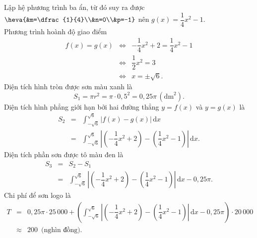 \begin{bt}
{		Lập hệ phương trình ba ẩn, từ đó  suy ra được $\heva{&m=\dfrac{1}{4}\\&n=0\\&p=-1}$ nên $g(x)=\dfrac{1}{4}x^2-1$.\\
		Phương trình  hoành độ giao điểm
		 \allowdisplaybreaks
		\begin{eqnarray*}
			 f(x)=g(x)&\Leftrightarrow&-\dfrac{1}{4}x^2+2=\dfrac{1}{4}x^2-1\\
			 &\Leftrightarrow&\dfrac{1}{2}x^2=3\\
			&\Leftrightarrow&x=\pm \sqrt  6.
		\end{eqnarray*}
		 Diện tích hình tròn được sơn màu xanh là \[S_1=\pi r^2=\pi\cdot 0{,}5^2=0{,}25 \pi\,(\text{dm}^2).\]
		Diện tích hình phẳng giới hạn bởi hai  đường thẳng $y=f(x)$ và $y=g(x)$ là
		\allowdisplaybreaks 
		\begin{eqnarray*}
			 S_2&=&\displaystyle\int_{-\sqrt 6}^{\sqrt 6}|f(x)-g(x)|\mathrm{\,d}x\\
			&=&\displaystyle\int_{-\sqrt  6}^{\sqrt 6}\left|\left(-\dfrac{1}{4}x^2+2\right)-\left(\dfrac{1}{4}x^2-1\right)\right|\mathrm{\,d}x.
		\end{eqnarray*}
		Diện tích phần  sơn được tô màu đen là
		 \allowdisplaybreaks
		\begin{eqnarray*}
			S_3&=&S_2-S_1\\ 
			&=&\displaystyle\int_{-\sqrt 6}^{\sqrt 6}\left|\left(-\dfrac{1}{4}x^2+2\right)-\left(\dfrac{1}{4}x^2-1\right)\right|  \mathrm{\,d}x-0{,}25 \pi.
		\end{eqnarray*}
		 Chi phí để sơn logo là
		 \allowdisplaybreaks
		\begin{eqnarray*}
			T&=&0{,}25 \pi \cdot 25\,000+\left(\displaystyle\int_{-\sqrt 6}^{\sqrt 6}\left|\left(-\dfrac{1}{4}x^2+2\right)-\left(\dfrac{1}{4}x^2-1\right)\right|  \mathrm{\,d}x-0{,}25 \pi\right)\cdot 20\,000\\
			&\approx& 200\,\text{ (nghìn  đồng).}
		\end{eqnarray*}
	} 
\end{bt}

